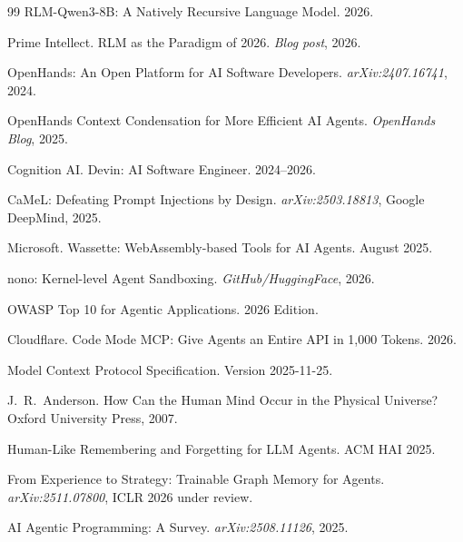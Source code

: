 \documentclass[11pt]{article}
\begin{document}
\begin{thebibliography}{99}
RLM-Qwen3-8B: A Natively Recursive Language Model.
2026.

Prime Intellect.
RLM as the Paradigm of 2026.
\textit{Blog post}, 2026.

OpenHands: An Open Platform for AI Software Developers.
\textit{arXiv:2407.16741}, 2024.

OpenHands Context Condensation for More Efficient AI Agents.
\textit{OpenHands Blog}, 2025.

Cognition AI.
Devin: AI Software Engineer.
2024--2026.

CaMeL: Defeating Prompt Injections by Design.
\textit{arXiv:2503.18813}, Google DeepMind, 2025.

Microsoft.
Wassette: WebAssembly-based Tools for AI Agents.
August 2025.

nono: Kernel-level Agent Sandboxing.
\textit{GitHub/HuggingFace}, 2026.

OWASP Top 10 for Agentic Applications.
2026 Edition.

Cloudflare.
Code Mode MCP: Give Agents an Entire API in 1,000 Tokens.
2026.

Model Context Protocol Specification.
Version 2025-11-25.

J.~R.~Anderson.
How Can the Human Mind Occur in the Physical Universe?
Oxford University Press, 2007.

Human-Like Remembering and Forgetting for LLM Agents.
ACM HAI 2025.

From Experience to Strategy: Trainable Graph Memory for Agents.
\textit{arXiv:2511.07800}, ICLR 2026 under review.

AI Agentic Programming: A Survey.
\textit{arXiv:2508.11126}, 2025.

\end{thebibliography}
\end{document}
